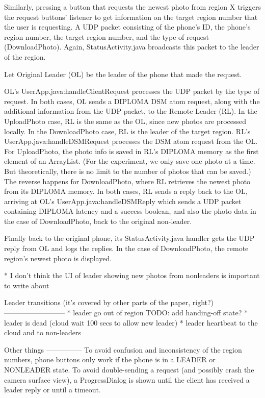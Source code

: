 Similarly, pressing a button that requests the newest photo from region X triggers the request buttons’ listener to get information on the target region number that the user is requesting. A UDP packet consisting of the phone’s ID, the phone’s region number, the target region number, and the type of request (DownloadPhoto). Again, StatusActivity.java broadcasts this packet to the leader of the region.

Let Original Leader (OL) be the leader of the phone that made the request. 

OL’s UserApp.java:handleClientRequest processes the UDP packet by the type of request. In both cases, OL sends a DIPLOMA DSM atom request, along with the additional information from the UDP packet, to the Remote Leader (RL). In the UploadPhoto case, RL is the same as the OL, since new photos are processed locally. In the DownloadPhoto case, RL is the leader of the target region. RL’s UserApp.java:handleDSMRequest processes the DSM atom request from the OL. For UploadPhoto, the photo info is saved in RL’s DIPLOMA memory as the first element of an ArrayList. (For the experiment, we only save one photo at a time. But theoretically, there is no limit to the number of photos that can be saved.) The reverse happens for DownloadPhoto, where RL retrieves the newest photo from its DIPLOMA memory.  In both cases, RL sends a reply back to the OL, arriving at OL’s UserApp.java:handleDSMReply which sends a UDP packet containing DIPLOMA latency and a success boolean, and also the photo data in the case of DownloadPhoto, back to the original non-leader.

Finally back to the original phone, its StatusActivity.java handler gets the UDP reply from OL and logs the replies. In the case of DownloadPhoto, the remote region’s newest photo is displayed.

* I don’t think the UI of leader showing new photos from nonleaders is important to write about

Leader transitions (it’s covered by other parts of the paper, right?)
--------------------------
* leader go out of region TODO: add handing-off state?
* leader is dead (cloud wait 100 secs to allow new leader)
* leader heartbeat to the cloud and to non-leaders

 Other things
---------------
To avoid confusion and inconsistency of the region numbers, phone buttons only work if the phone is in a LEADER or NONLEADER state.  To avoid double-sending a request (and possibly crash the camera surface view), a ProgressDialog is shown until the client has received a leader reply or until a timeout. 

